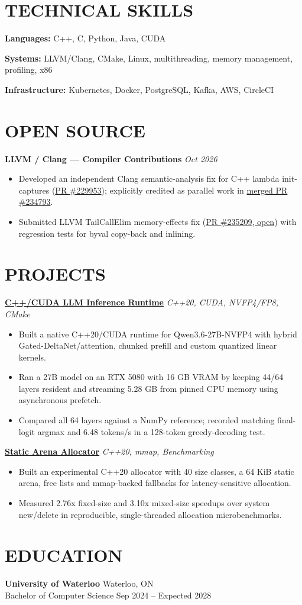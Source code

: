 \documentclass[11pt,letterpaper]{article}
\begin{document}
\section*{TECHNICAL SKILLS}
\noindent\textbf{Languages:} C++, C, Python, Java, CUDA\par
\noindent\textbf{Systems:} LLVM/Clang, CMake, Linux, multithreading, memory management, profiling, x86\par
\noindent\textbf{Infrastructure:} Kubernetes, Docker, PostgreSQL, Kafka, AWS, CircleCI\par
\section*{OPEN SOURCE}
\noindent\textbf{LLVM / Clang --- Compiler Contributions} \hfill \textit{Oct 2026}\par
\begin{itemize}
\item Developed an independent Clang semantic-analysis fix for C++ lambda init-captures (\href{https://github.com/llvm/llvm-project/pull/229953}{PR \#229953}); explicitly credited as parallel work in \href{https://github.com/llvm/llvm-project/pull/234793}{merged PR \#234793}.
\item Submitted LLVM TailCallElim memory-effects fix (\href{https://github.com/llvm/llvm-project/pull/235209}{PR \#235209, open}) with regression tests for byval copy-back and inlining.
\end{itemize}
\section*{PROJECTS}
\noindent\href{https://github.com/beanscrack/LLM-Inference-C-CUDA-}{\textbf{C++/CUDA LLM Inference Runtime}} \hfill \textit{C++20, CUDA, NVFP4/FP8, CMake}\par
\begin{itemize}
\item Built a native C++20/CUDA runtime for Qwen3.6-27B-NVFP4 with hybrid Gated-DeltaNet/attention, chunked prefill and custom quantized linear kernels.
\item Ran a 27B model on an RTX 5080 with 16 GB VRAM by keeping 44/64 layers resident and streaming 5.28 GB from pinned CPU memory using asynchronous prefetch.
\item Compared all 64 layers against a NumPy reference; recorded matching final-logit argmax and 6.48 tokens/s in a 128-token greedy-decoding test.
\end{itemize}
\noindent\href{https://github.com/beanscrack/hft-static-arena-allocator}{\textbf{Static Arena Allocator}} \hfill \textit{C++20, mmap, Benchmarking}\par
\begin{itemize}
\item Built an experimental C++20 allocator with 40 size classes, a 64 KiB static arena, free lists and mmap-backed fallbacks for latency-sensitive allocation.
\item Measured 2.76x fixed-size and 3.10x mixed-size speedups over system new/delete in reproducible, single-threaded allocation microbenchmarks.
\end{itemize}
\section*{EDUCATION}
\noindent\textbf{University of Waterloo} \hfill Waterloo, ON\\
Bachelor of Computer Science \hfill Sep 2024 -- Expected 2028\par
\end{document}
